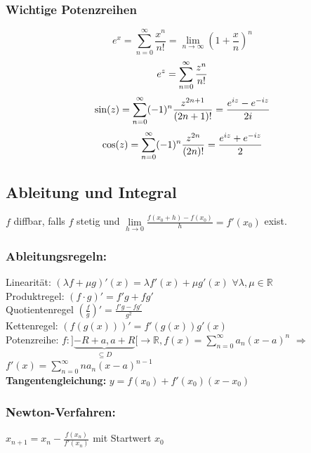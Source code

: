 \documentclass[6pt,a4paper]{scrartcl}
\newcommand{\enbrace}[1]{\ensuremath{\left(#1\right)}}
\begin{document}
\begin{multicols*}{4}
\subsubsection{Wichtige Potenzreihen}
\label{sub:potenzreihen}
\begin{equation*}
 	e^x = \sum_{n = 0}^{\infty} \frac{x^n}{n!} = \lim\limits_{n\to\infty}\enbrace{1+\frac{x}{n}}^n
\end{equation*}
\begin{equation*}
 	e^z = \sum_{n = 0}^{\infty} \frac{z^n}{n!} \\
\end{equation*}
\begin{equation*}
	 \sin (z) = \sum_{n = 0}^{\infty} (-1)^n \frac{z^{2n +1}}{(2n +1)!} = \frac{e^{iz} - e^{-iz}}{2i} \\
\end{equation*}
\begin{equation*}
	 \cos (z) = \sum_{n = 0}^{\infty} (-1)^n \frac{z^{2n}}{(2n)!} = \frac{e^{iz} + e^{-iz}}{2}\\
 \end{equation*}





\subsection{Ableitung und Integral}
$f$ diffbar, falls $f$ stetig und $\underset{h\rightarrow 0}{\lim}\frac{f(x_0+h)-f(x_0)}{h}=f'(x_0)$ exist.
\subsubsection{Ableitungsregeln:}
Linearität: $(\lambda f + \mu g)' (x) = \lambda f'(x) + \mu g'(x)$ \quad $\forall \lambda, \mu \in \mathbb R$ \\
Produktregel: $(f \cdot g)' = f' g + f g'$\\
Quotientenregel $\enbrace{\frac{f}{g}}' = \frac{f'g - fg'}{g^2}$\\
Kettenregel: $\left( f(g(x)) \right)' = f'(g(x)) g'(x)$\\
Potenzreihe: $f: ] \underbrace{-R+a, a+R}_{\subseteq D}	 [ \rightarrow \mathbb R, f(x) = \sum_{n=0}^{\infty} a_n (x -a)^n$ \quad $\Rightarrow$ \quad $f'(x) = \sum_{n=0}^{\infty} n a_{n} (x-a)^{n-1}$\\
\textbf{Tangentengleichung:} $y=f(x_0)+f'(x_0)(x-x_0)$

\subsubsection{Newton-Verfahren:}
$x_{n+1}=x_n-\frac{f(x_n)}{f'(x_n)}$ mit Startwert $x_0$


\end{multicols*}
\end{document}
